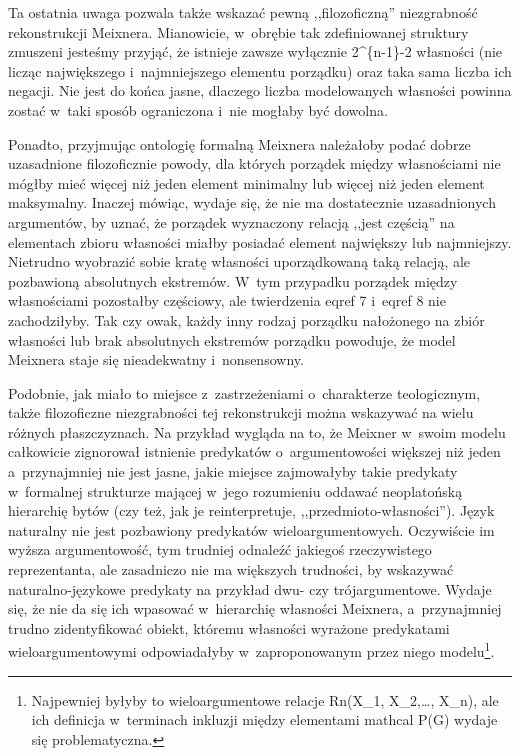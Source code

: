 Ta ostatnia uwaga pozwala także wskazać pewną ,,filozoficzną'' niezgrabność rekonstrukcji Meixnera. Mianowicie, w~obrębie tak zdefiniowanej struktury zmuszeni jesteśmy przyjąć, że istnieje zawsze wyłącznie 2\^{}\{n-1\}-2 własności (nie licząc największego i~najmniejszego elementu porządku) oraz taka sama liczba ich negacji. Nie jest do końca jasne, dlaczego liczba modelowanych własności powinna zostać w~taki sposób ograniczona i~nie mogłaby być dowolna.

Ponadto, przyjmując ontologię formalną Meixnera należałoby podać dobrze uzasadnione filozoficznie powody, dla których porządek między własnościami nie mógłby mieć więcej niż jeden element minimalny lub więcej niż jeden element maksymalny. Inaczej mówiąc, wydaje się, że nie ma dostatecznie uzasadnionych argumentów, by uznać, że porządek wyznaczony relacją ,,jest częścią'' na elementach zbioru własności miałby posiadać element największy lub najmniejszy. Nietrudno wyobrazić sobie kratę własności uporządkowaną taką relacją, ale pozbawioną absolutnych ekstremów. W~tym przypadku porządek między własnościami pozostałby częściowy, ale twierdzenia eqref 7 i~eqref 8 nie zachodziłyby. Tak czy owak, każdy inny rodzaj porządku nałożonego na zbiór własności lub brak absolutnych ekstremów porządku powoduje, że model Meixnera staje się nieadekwatny i~nonsensowny.

Podobnie, jak miało to miejsce z~zastrzeżeniami o~charakterze teologicznym, także filozoficzne niezgrabności tej rekonstrukcji można wskazywać na wielu różnych płaszczyznach. Na przykład wygląda na to, że Meixner w~swoim modelu całkowicie zignorował istnienie predykatów o~argumentowości większej niż jeden a~przynajmniej nie jest jasne, jakie miejsce zajmowałyby takie predykaty w~formalnej strukturze mającej w~jego rozumieniu oddawać neoplatońską hierarchię bytów (czy też, jak je reinterpretuje, ,,przedmioto-własności''). Język naturalny nie jest pozbawiony predykatów wieloargumentowych. Oczywiście im wyższa argumentowość, tym trudniej odnaleźć jakiegoś rzeczywistego reprezentanta, ale zasadniczo nie ma większych trudności, by wskazywać naturalno-językowe predykaty na przykład dwu- czy trójargumentowe. Wydaje się, że nie da się ich wpasować w~hierarchię własności Meixnera, a~przynajmniej trudno zidentyfikować obiekt, któremu własności wyrażone predykatami wieloargumentowymi odpowiadałyby w~zaproponowanym przez niego modelu\footnote{Najpewniej byłyby to wieloargumentowe relacje Rn(X\_1, X\_2,…, X\_n), ale ich definicja w~terminach inkluzji między elementami mathcal P(G) wydaje się problematyczna.}.

